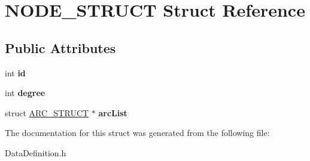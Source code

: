 \hypertarget{structNODE__STRUCT}{\section{N\-O\-D\-E\-\_\-\-S\-T\-R\-U\-C\-T Struct Reference}
\label{structNODE__STRUCT}
}
\subsection*{Public Attributes}
\begin{DoxyCompactItemize}
\item 
\hypertarget{structNODE__STRUCT_a4386a981b07860b03b46d11c5280445d}{int {\bfseries id}}\label{structNODE__STRUCT_a4386a981b07860b03b46d11c5280445d}

\item 
\hypertarget{structNODE__STRUCT_a4d119525d60341ec5fb1c0f040adb867}{int {\bfseries degree}}\label{structNODE__STRUCT_a4d119525d60341ec5fb1c0f040adb867}

\item 
\hypertarget{structNODE__STRUCT_a0a9adf25cd6c875ce28817790e2d93f7}{struct \hyperlink{structARC__STRUCT}{A\-R\-C\-\_\-\-S\-T\-R\-U\-C\-T} $\ast$ {\bfseries arc\-List}}\label{structNODE__STRUCT_a0a9adf25cd6c875ce28817790e2d93f7}

\end{DoxyCompactItemize}


The documentation for this struct was generated from the following file\-:\begin{DoxyCompactItemize}
\item 
Data\-Definition.\-h\end{DoxyCompactItemize}
